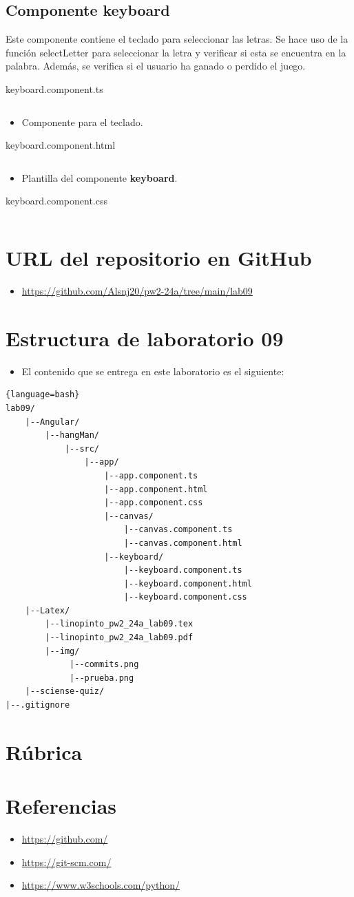 \documentclass{article}
\newenvironment{block}{\captionsetup{type=listing}}{}
\newcommand{\itemPracticeNumber}{09}
\begin{document}
\subsection{Componente keyboard}
Este componente contiene el teclado para seleccionar las letras. Se hace uso de la función selectLetter para seleccionar la letra y verificar si esta se encuentra en la palabra. Además, se verifica si el usuario ha ganado o perdido el juego.
\begin{block}
	\caption{keyboard.component.ts}
	\inputminted{TypeScript}{../hangMan/src/app/keyboard/keyboard.component.ts}
	\begin{itemize}
		\item Componente para el teclado.
	\end{itemize}

	\caption{keyboard.component.html}
	\inputminted{HTML}{../hangMan/src/app/keyboard/keyboard.component.html}
	\begin{itemize}
		\item Plantilla del componente \textbf{keyboard}.
	\end{itemize}

	\caption{keyboard.component.css}
	\inputminted{CSS}{../hangMan/src/app/keyboard/keyboard.component.css}
\end{block}
\pagebreak

\section{URL del repositorio en GitHub}
\begin{itemize}
	\item \url{https://github.com/Alsnj20/pw2-24a/tree/main/lab09}
\end{itemize}
\pagebreak
\section{Estructura de laboratorio \itemPracticeNumber}
\begin{itemize}
	\item El contenido que se entrega en este laboratorio es el siguiente:
\end{itemize}
\begin{lstlisting}{language=bash}
lab09/
	|--Angular/
		|--hangMan/
			|--src/
				|--app/
					|--app.component.ts
					|--app.component.html
					|--app.component.css
					|--canvas/
						|--canvas.component.ts
						|--canvas.component.html
					|--keyboard/
						|--keyboard.component.ts
						|--keyboard.component.html
						|--keyboard.component.css
	|--Latex/
		|--linopinto_pw2_24a_lab09.tex
		|--linopinto_pw2_24a_lab09.pdf
		|--img/
			 |--commits.png
			 |--prueba.png
	|--sciense-quiz/
|--.gitignore
\end{lstlisting}
\section{Rúbrica}

\section{Referencias}
\begin{itemize}
	\item \url{https://github.com/}
	\item \url{https://git-scm.com/}
	\item \url{https://www.w3schools.com/python/}
\end{itemize}

\pagebreak
\end{document}
